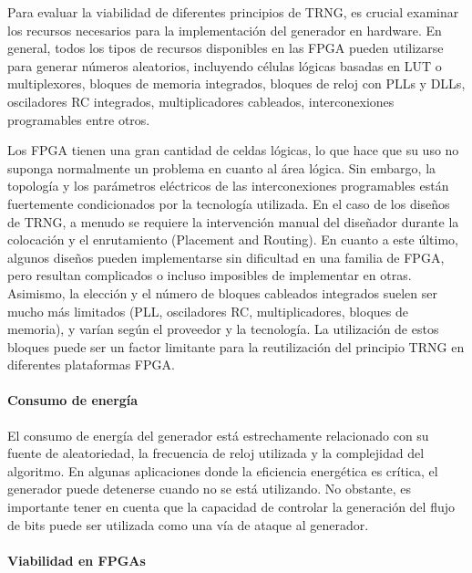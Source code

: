                 Para evaluar la viabilidad de diferentes principios de TRNG, es crucial examinar los recursos necesarios para la implementación del generador en hardware. En general, todos los tipos de recursos disponibles en las FPGA pueden utilizarse para generar números aleatorios, incluyendo células lógicas basadas en LUT o multiplexores, bloques de memoria integrados, bloques de reloj con PLLs y DLLs, osciladores RC integrados, multiplicadores cableados, interconexiones programables entre otros.
					
                Los FPGA tienen una gran cantidad de celdas lógicas, lo que hace que su uso no suponga normalmente un problema en cuanto al área lógica. Sin embargo, la topología y los parámetros eléctricos de las interconexiones programables están fuertemente condicionados por la tecnología utilizada. En el caso de los diseños de TRNG, a menudo se requiere la intervención manual del diseñador durante la colocación y el enrutamiento (Placement and Routing). En cuanto a este último, algunos diseños pueden implementarse sin dificultad en una familia de FPGA, pero resultan complicados o incluso imposibles de implementar en otras. Asimismo, la elección y el número de bloques cableados integrados suelen ser mucho más limitados (PLL, osciladores RC, multiplicadores, bloques de memoria), y varían según el proveedor y la tecnología. La utilización de estos bloques puede ser un factor limitante para la reutilización del principio TRNG en diferentes plataformas FPGA.

	            \paragraph{Consumo de energía\\}
					
                El consumo de energía del generador está estrechamente relacionado con su fuente de aleatoriedad, la frecuencia de reloj utilizada y la complejidad del algoritmo. En algunas aplicaciones donde la eficiencia energética es crítica, el generador puede detenerse cuando no se está utilizando. No obstante, es importante tener en cuenta que la capacidad de controlar la generación del flujo de bits puede ser utilizada como una vía de ataque al generador.
					
	            \paragraph{Viabilidad en FPGAs\\}

